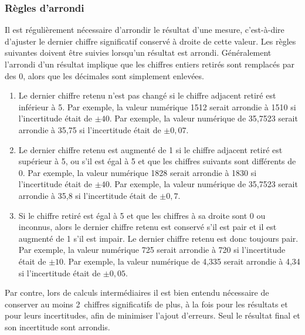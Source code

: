\subsubsection{Règles d'arrondi}
\label{s:regles_arrondi}

Il est régulièrement nécessaire d'arrondir le résultat d'une mesure, c'est-à-dire d'ajuster le dernier chiffre significatif conservé à droite de cette valeur. Les règles suivantes doivent être suivies lorsqu'un résultat est arrondi. Généralement l'arrondi d'un résultat implique que les chiffres entiers retirés sont remplacés par des 0, alors que les décimales sont simplement enlevées.
\begin{enumerate}
  \item Le dernier chiffre retenu n'est pas changé si le chiffre adjacent retiré est inférieur à 5. Par exemple, la valeur numérique 1512 serait arrondie à 1510 si l'incertitude était de $\pm 40$. Par exemple, la valeur numérique de 35,7523 serait arrondie à 35,75 si l'incertitude était de $\pm 0,07$.
  \item Le dernier chiffre retenu est augmenté de 1 si le chiffre adjacent retiré est supérieur à 5, ou s'il est égal à 5 et que les chiffres suivants sont différents de 0. Par exemple, la valeur numérique 1828 serait arrondie à 1830 si l'incertitude était de $\pm 40$. Par exemple, la valeur numérique de 35,7523 serait arrondie à 35,8 si l'incertitude était de $\pm 0,7$.
  \item Si le chiffre retiré est égal à 5 et que les chiffres à sa droite sont 0 ou inconnus, alors le dernier chiffre retenu est conservé s'il est pair et il est augmenté de 1 s'il est impair. Le dernier chiffre retenu est donc toujours pair. Par exemple, la valeur numérique 725 serait arrondie à 720 si l'incertitude était de $\pm 10$. Par exemple, la valeur numérique de 4,335 serait arrondie à 4,34 si l'incertitude était de $\pm 0,05$.
\end{enumerate}
Par contre, lors de calculs intermédiaires il est bien entendu nécessaire de conserver au moins 2~chiffres significatifs de plus, à la fois pour les résultats et pour leurs incertitudes, afin de minimiser l'ajout d'erreurs. Seul le résultat final et son incertitude sont arrondis.
